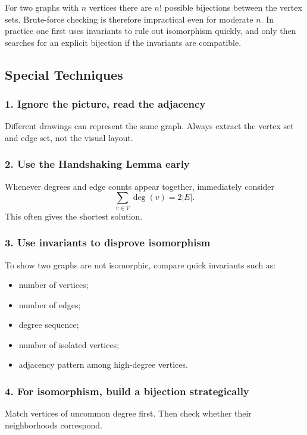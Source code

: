 \begin{extension}[title={Why isomorphism can be difficult}]
For two graphs with \(n\) vertices there are \(n!\) possible bijections between the vertex sets. Brute-force checking is therefore impractical even for moderate \(n\). In practice one first uses invariants to rule out isomorphism quickly, and only then searches for an explicit bijection if the invariants are compatible.
\end{extension}

\subsection{Special Techniques}

\subsubsection*{1. Ignore the picture, read the adjacency}
Different drawings can represent the same graph. Always extract the vertex set and edge set, not the visual layout.

\subsubsection*{2. Use the Handshaking Lemma early}
Whenever degrees and edge counts appear together, immediately consider
\[
\sum_{v\in V}\deg(v)=2|E|.
\]
This often gives the shortest solution.

\subsubsection*{3. Use invariants to disprove isomorphism}
To show two graphs are not isomorphic, compare quick invariants such as:
\begin{itemize}[leftmargin=*]
    \item number of vertices;
    \item number of edges;
    \item degree sequence;
    \item number of isolated vertices;
    \item adjacency pattern among high-degree vertices.
\end{itemize}

\subsubsection*{4. For isomorphism, build a bijection strategically}
Match vertices of uncommon degree first. Then check whether their neighborhoods correspond.

